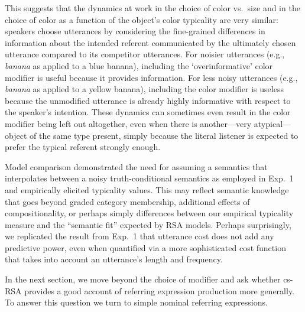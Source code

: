 \documentclass[11pt]{article}
\newcommand{\jd}[1]{\textcolor{Red}{[jd: #1]}}
\newcommand{\ndg}[1]{\textcolor{Green}{[ndg: #1]}}
\begin{document}
This suggests that the dynamics at work in the choice of color vs.~size and in the choice of color as a function of the object's color typicality are very similar: speakers choose utterances by considering the fine-grained differences in information about the intended referent communicated by the ultimately chosen utterance compared to its competitor utterances. For noisier utterances (e.g., \emph{banana} as applied to a blue banana), including the `overinformative' color modifier is useful because it provides information. For less noisy utterances (e.g., \emph{banana} as applied to a yellow banana), including the color modifier is useless because the unmodified utterance is already highly informative with respect to the speaker's intention. These dynamics can sometimes even result in the color modifier being left out altogether, even when there is another---very atypical---object of the same type present, simply because the literal listener is expected to prefer the typical referent strongly enough.

Model comparison demonstrated the need for assuming a semantics that interpolates between a noisy truth-conditional semantics as employed in Exp.~1 and empirically elicited typicality values. 
This may reflect semantic knowledge that goes beyond graded category membership, additional effects of compositionality, or perhaps simply differences between our empirical typicality measure and the ``semantic fit'' expected by RSA models.
Perhaps surprisingly, we replicated the result from Exp.~1 that utterance cost does not add any predictive power, even when quantified via a more sophisticated cost function that takes into account an utterance's length and frequency.

In the next section, we move beyond the choice of modifier and ask whether cs-RSA provides a good account of  referring expression production more generally. To answer this question we turn to simple nominal referring expressions.
\end{document}
